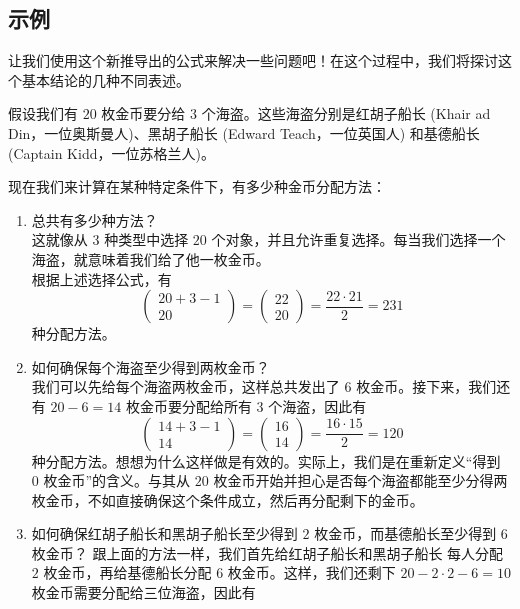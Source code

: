 
\subsection{示例}

让我们使用这个新推导出的公式来解决一些问题吧！在这个过程中，我们将探讨这个基本结论的几种不同表述。\\

\begin{example}
    假设我们有 $20$ 枚金币要分给 $3$ 个海盗。这些海盗分别是红胡子船长 (Khair ad Din，一位奥斯曼人)、黑胡子船长 (Edward Teach，一位英国人) 和基德船长 (Captain Kidd，一位苏格兰人)。

    现在我们来计算在某种特定条件下，有多少种金币分配方法：
    \begin{enumerate}[label=(\arabic*)]
        \item 总共有多少种方法？\\
              这就像从 $3$ 种类型中选择 $20$ 个对象，并且允许重复选择。每当我们选择一个海盗，就意味着我们给了他一枚金币。\\
              根据上述选择公式，有
              \[\begin{pmatrix}20+3-1\\20\end{pmatrix}=\begin{pmatrix}22\\20\end{pmatrix}=\frac{22 \cdot 21}{2}=231\]
              种分配方法。
        \item 如何确保每个海盗至少得到两枚金币？\\
              我们可以先给每个海盗两枚金币，这样总共发出了 $6$ 枚金币。接下来，我们还有 $20 - 6 = 14$ 枚金币要分配给所有 $3$ 个海盗，因此有
              \[\begin{pmatrix}14+3-1\\14\end{pmatrix}=\begin{pmatrix}16\\14\end{pmatrix}=\frac{16 \cdot 15}{2}=120\]
              种分配方法。想想为什么这样做是有效的。实际上，我们是在重新定义``得到 $0$ 枚金币''的含义。与其从 $20$ 枚金币开始并担心是否每个海盗都能至少分得两枚金币，不如直接确保这个条件成立，然后再分配剩下的金币。
        \item 如何确保红胡子船长和黑胡子船长至少得到 $2$ 枚金币，而基德船长至少得到 $6$ 枚金币？
              跟上面的方法一样，我们首先给红胡子船长和黑胡子船长 每人分配 $2$ 枚金币，再给基德船长分配 $6$ 枚金币。这样，我们还剩下 $20 - 2 \cdot 2 - 6 = 10$ 枚金币需要分配给三位海盗，因此有

\end{enumerate}
\end{example}
